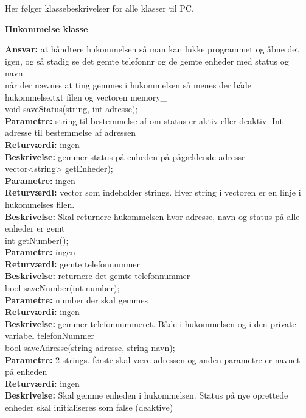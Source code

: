 Her følger klassebeskrivelser for alle klasser til PC. \\

{\centering
\textbf{Hukommelse klasse}\par
}
\textbf{Ansvar:} at håndtere hukommelsen så man kan lukke programmet og åbne det igen, og så stadig se det gemte telefonnr og de gemte enheder med status og navn. \\
når der nævnes at ting gemmes i hukommelsen så menes der både hukommelse.txt filen og vectoren memory\_ \\

void saveStatus(string, int adresse); \\
\textbf{Parametre:} string til bestemmelse af om status er aktiv eller deaktiv. Int adresse til bestemmelse af adressen \\
\textbf{Returværdi:} ingen \\
\textbf{Beskrivelse:} gemmer status på enheden på pågældende adresse \\

vector<string> getEnheder); \\
\textbf{Parametre:} ingen \\
\textbf{Returværdi:} vector som indeholder strings. Hver string i vectoren er en linje i hukommelses filen. \\
\textbf{Beskrivelse:}  Skal returnere hukommelsen hvor adresse, navn og status på alle enheder er gemt \\

int getNumber(); \\
\textbf{Parametre:} ingen \\
\textbf{Returværdi:} gemte telefonnummer \\
\textbf{Beskrivelse:} returnere det gemte telefonnummer \\

bool saveNumber(int number); \\
\textbf{Parametre:} number der skal gemmes \\
\textbf{Returværdi:} ingen \\
\textbf{Beskrivelse:} gemmer telefonnummeret. Både i hukommelsen og i den private variabel telefonNummer \\

bool saveAdresse(string adresse, string navn); \\
\textbf{Parametre:} 2 strings. første skal være adressen og anden parametre er navnet på enheden \\
\textbf{Returværdi:} ingen \\
\textbf{Beskrivelse:} Skal gemme enheden i hukommelsen. Status på nye oprettede enheder skal initialiseres som false (deaktive) \\

